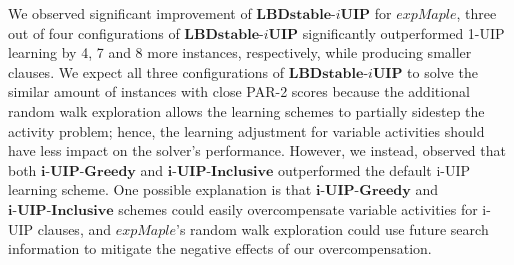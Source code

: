 \documentclass[runningheads]{llncs}
\newcommand{\IUIP}{\textbf{LBDstable-$i$UIP}}
\newcommand{\IUIPGreedy}{\textbf{i-UIP-Greedy}}
\newcommand{\IUIPActive}{\textbf{i-UIP-Inclusive}}
\newcommand{\expSATShort}{\textit{expMaple} }
\begin{document}
We observed significant improvement of $\IUIP$ for $\expSATShort$,
three out of four configurations of $\IUIP$ significantly outperformed
1-UIP learning by 4, 7 and 8 more instances, respectively, while
producing smaller clauses. We expect all three configurations of
$\IUIP$ to solve the similar amount of instances with close PAR-2
scores because the additional random walk exploration allows the
learning schemes to partially sidestep the activity problem; hence,
the learning adjustment for variable activities should have less
impact on the solver's performance. However, we instead, observed that
both $\IUIPGreedy$ and $\IUIPActive$ outperformed the default i-UIP
learning scheme. One possible explanation is that $\IUIPGreedy$ and
$\IUIPActive$ schemes could easily overcompensate variable activities
for i-UIP clauses, and $\expSATShort$'s random walk exploration could
use future search information to mitigate the negative effects of our
overcompensation.

{}

\end{document}
